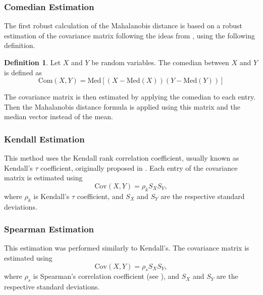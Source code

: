 \documentclass[11pt]{article}
\theoremstyle{definition}
\newtheorem{definition}{Definition}[section]
\theoremstyle{remark}
\theoremstyle{remark}
\begin{document}
\subsubsection*{Comedian Estimation}

The first robust calculation of the Mahalanobis distance is based on a
robust estimation of the covariance matrix following the ideas from
\cite{falk1997mad}, using the following definition.
\begin{definition}
  Let $X$ and $Y$ be random variables. The comedian between $X$ and
  $Y$ is defined as
\[
  \mathrm{Com}(X,Y)=\mathrm{Med}\left[(X-\mathrm{Med}(X))(Y-\mathrm{Med}(Y))\right]
\]
\end{definition}
The covariance matrix is then estimated by applying the comedian to
each entry. Then the Mahalanobis distance formula is applied using
this matrix and the median vector instead of the mean.

\subsubsection*{Kendall Estimation}
This method uses the Kendall rank correlation coefficient, usually
known as Kendall's $\tau$ coefficient, originally proposed in
\cite{kendall1938new}. Each entry of the covariance matrix is
estimated using
\[
  \mathrm{Cov}(X,Y)=\rho_kS_XS_Y,
\]
where $\rho_k$ is Kendall's $\tau$ coefficient, and $S_X$ and $S_Y$
are the respective standard deviations.

\subsubsection*{Spearman Estimation}
This estimation was performed similarly to Kendall's. The covariance
matrix is estimated using
\[
  \mathrm{Cov}(X,Y)=\rho_sS_XS_Y,
\]
where $\rho_s$ is Spearman's correlation coefficient (see
\cite{ce1904general}), and $S_X$ and $S_Y$ are the respective standard
deviations.
\end{document}
